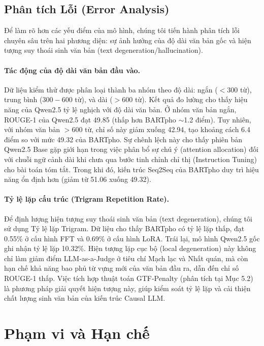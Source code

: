 \documentclass{article}
\begin{document}
\subsection{Phân tích Lỗi (Error Analysis)}

Để làm rõ hơn các yếu điểm của mô hình, chúng tôi tiến hành phân tích lỗi chuyên sâu trên hai phương diện: sự ảnh hưởng của độ dài văn bản gốc và hiện tượng suy thoái sinh văn bản (text degeneration/hallucination).

\paragraph{Tác động của độ dài văn bản đầu vào.} 
Dữ liệu kiểm thử được phân loại thành ba nhóm theo độ dài: ngắn ($<300$ từ), trung bình ($300-600$ từ), và dài ($>600$ từ). Kết quả đo lường cho thấy hiệu năng của Qwen2.5 tỷ lệ nghịch với độ dài văn bản. Ở nhóm văn bản ngắn, ROUGE-1 của Qwen2.5 đạt 49.85 (thấp hơn BARTpho $\sim$1.2 điểm). Tuy nhiên, với nhóm văn bản $>600$ từ, chỉ số này giảm xuống 42.94, tạo khoảng cách 6.4 điểm so với mức 49.32 của BARTpho. Sự chênh lệch này cho thấy phiên bản Qwen2.5 Base gặp giới hạn trong việc phân bổ sự chú ý (attention allocation) đối với chuỗi ngữ cảnh dài khi chưa qua bước tinh chỉnh chỉ thị (Instruction Tuning) cho bài toán tóm tắt. Trong khi đó, kiến trúc Seq2Seq của BARTpho duy trì hiệu năng ổn định hơn (giảm từ 51.06 xuống 49.32).

\paragraph{Tỷ lệ lặp cấu trúc (Trigram Repetition Rate).}
Để định lượng hiện tượng suy thoái sinh văn bản (text degeneration), chúng tôi sử dụng Tỷ lệ lặp Trigram. Dữ liệu cho thấy BARTpho có tỷ lệ lặp thấp, đạt 0.55\% ở cấu hình FFT và 0.69\% ở cấu hình LoRA. Trái lại, mô hình Qwen2.5 gốc ghi nhận tỷ lệ lặp 10.32\%. Hiện tượng lặp cục bộ (local degeneration) này không chỉ làm giảm điểm LLM-as-a-Judge ở tiêu chí Mạch lạc và Nhất quán, mà còn hạn chế khả năng bao phủ từ vựng mới của văn bản đầu ra, dẫn đến chỉ số ROUGE-1 thấp. Việc tích hợp thuật toán GTF-Penalty (phân tích tại Mục 5.2) là phương pháp giải quyết hiện tượng này, giúp kiểm soát tỷ lệ lặp và cải thiện chất lượng sinh văn bản của kiến trúc Causal LLM.

\section{Phạm vi và Hạn chế}
\label{sec:limitations}
\end{document}
